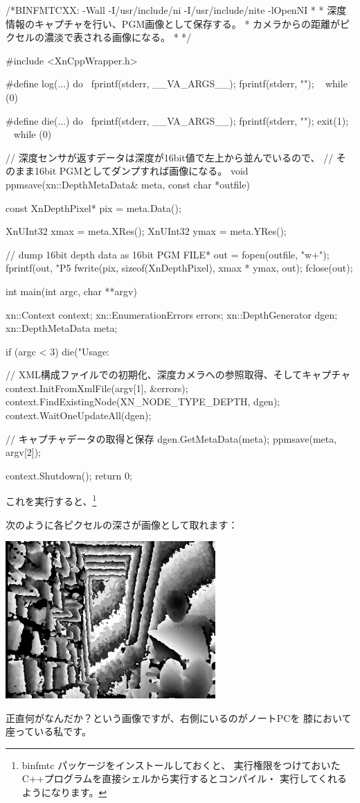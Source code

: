 \documentclass[mingoth,a4paper]{jsarticle}
\begin{document}
\begin{commandline}
/*BINFMTCXX: -Wall -I/usr/include/ni -I/usr/include/nite -lOpenNI
 *
 * 深度情報のキャプチャを行い、PGM画像として保存する。
 * カメラからの距離がピクセルの濃淡で表される画像になる。
 *
 */

#include <XnCppWrapper.h>

#define log(...) do { \
        fprintf(stderr, __VA_ARGS__); fprintf(stderr, "\n");    \
    } while (0)

#define die(...) do { \
        fprintf(stderr, __VA_ARGS__); fprintf(stderr, "\n"); exit(1);   \
    } while (0)

// 深度センサが返すデータは深度が16bit値で左上から並んでいるので、
// そのまま16bit PGMとしてダンプすれば画像になる。
void
ppmsave(xn::DepthMetaData& meta, const char *outfile) {
    const XnDepthPixel* pix = meta.Data();

    XnUInt32 xmax = meta.XRes();
    XnUInt32 ymax = meta.YRes();

    // dump 16bit depth data as 16bit PGM
    FILE* out = fopen(outfile, "w+");
    fprintf(out, "P5\n%
    fwrite(pix, sizeof(XnDepthPixel), xmax * ymax, out);
    fclose(out);
}

int
main(int argc, char **argv) {
    xn::Context context;
    xn::EnumerationErrors errors;
    xn::DepthGenerator dgen;
    xn::DepthMetaData meta;

    if (argc < 3) {
        die("Usage: %
    }

    // XML構成ファイルでの初期化、深度カメラへの参照取得、そしてキャプチャ
    context.InitFromXmlFile(argv[1], &errors);
    context.FindExistingNode(XN_NODE_TYPE_DEPTH, dgen);
    context.WaitOneUpdateAll(dgen);

    // キャプチャデータの取得と保存
    dgen.GetMetaData(meta);
    ppmsave(meta, argv[2]);

    context.Shutdown();
    return 0;
}
\end{commandline}

これを実行すると、\footnote{binfmtc パッケージをインストールしておくと、
実行権限をつけておいたC++プログラムを直接シェルから実行するとコンパイル・
実行してくれるようになります。}
次のように各ピクセルの深さが画像として取れます：
\begin{center}
\includegraphics[height=6cm]{image201101/depth.eps}
\end{center}
正直何がなんだか？という画像ですが、右側にいるのがノートPCを
膝において座っている私です。
\end{document}
